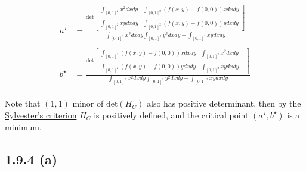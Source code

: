 \documentclass{exam}
\begin{document}
\begin{equation}
    \begin{aligned}
        a^\star&=
        \displaystyle \frac{ 
            \text{det}\begin{bmatrix}
                \displaystyle\int_{[0,1]^2} x^2 d x d y & \displaystyle\int_{[0,1]^2} (f(x,y) - f(0,0)) x d x d y\\
                \\
                \displaystyle\int_{[0,1]^2} xy d x d y & \displaystyle\int_{[0,1]^2} (f(x,y) - f(0,0)) y d x d y
            \end{bmatrix}
            }
            {
             \displaystyle\int_{[0,1]^2} x^2 d x d y \displaystyle\int_{[0,1]^2} y^2 d x d y  - \displaystyle\int_{[0,1]^2} xy d x d y
            }\\
        \\
        b^\star &=
       \displaystyle \frac{ 
           \text{det}\begin{bmatrix}
                \displaystyle\int_{[0,1]^2} (f(x,y) - f(0,0)) x d x d y & \displaystyle\int_{[0,1]^2} x^2 d x d y \\
               \\
                \displaystyle\int_{[0,1]^2} (f(x,y) - f(0,0)) y d x d y & \displaystyle\int_{[0,1]^2} xy d x d y &
           \end{bmatrix}
           }
           {
            \displaystyle\int_{[0,1]^2} x^2 d x d y \displaystyle\int_{[0,1]^2} y^2 d x d y  - \displaystyle\int_{[0,1]^2} xy d x d y
           }
    \end{aligned}
\end{equation}\\
Note that $(1,1)$ minor of $\text{det}( H_{C})$ also has positive determinant, then by the \href{https://en.wikipedia.org/wiki/Sylvester%27s_criterion}{Sylvester's criterion} $H_{C}$ is positively defined, and the critical point $(a^\star,b^\star)$ is a minimum. 
\\
\subsection*{1.9.4 (a)}
\end{document}
